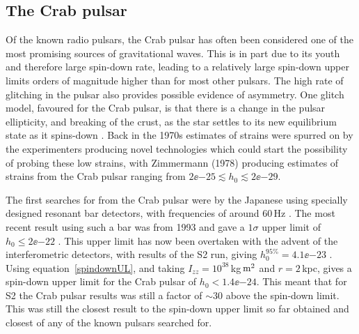 \subsection{The Crab pulsar}\label{CrabPulsarResults}
Of the known radio pulsars, the Crab pulsar has often been considered one of the most promising
sources of gravitational waves. This is in part due to its youth and therefore large spin-down rate,
leading to a relatively large spin-down upper limits orders of magnitude higher than for most other
pulsars. The high rate of glitching in the pulsar also provides possible evidence of asymmetry. One
glitch model, favoured for the Crab pulsar, is that there is a change in the pulsar ellipticity, and
breaking of the crust, as the star settles to its new equilibrium state as it spins-down
\cite{PulsarAstronomy}. Back in the 1970s estimates of \gw strains were spurred on by the
experimenters producing novel technologies which could start the possibility of probing these low
strains, with Zimmermann (1978) \cite{Zimmermann:1978} producing estimates of \gw strains from the
Crab pulsar ranging from $2\ee{-25} \lesssim h_0 \lesssim 2\ee{-29}$. 

The first searches for \gws from the Crab pulsar were by the Japanese using specially designed
resonant bar detectors, with frequencies of around 60\,Hz \cite{Hirakawa:1978}. The most recent
result using such a bar was from 1993 and gave a $1\sigma$ upper limit of $h_0 \le 2\ee{-22}$
\cite{Suzuki:1995}. This upper limit has now been overtaken with the advent of the
interferometric \gw detectors, with results of the S2 run, giving $h_0^{95\%} = 4.1\ee{-23}$
\cite{Abbott:2005}. Using equation~\ref{spindownUL}, and taking $I_{zz}=10^{38}$\,kg\,${\rm m}^2$
and $r = 2$\,kpc, gives a spin-down upper limit for the Crab pulsar of $h_0 < 1.4\ee{-24}$. This
meant that for S2 the Crab pulsar results was still a factor of $\sim 30$ above the spin-down limit.
This was still the closest result to the spin-down upper limit so far obtained and closest of any of
the known pulsars searched for.

